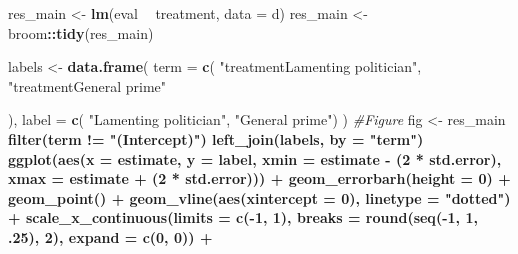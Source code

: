 \documentclass[]{book}
\newenvironment{Shaded}{\begin{snugshade}}{\end{snugshade}}
\newcommand{\KeywordTok}[1]{\textcolor[rgb]{0.13,0.29,0.53}{\textbf{#1}}}
\newcommand{\DataTypeTok}[1]{\textcolor[rgb]{0.13,0.29,0.53}{#1}}
\newcommand{\DecValTok}[1]{\textcolor[rgb]{0.00,0.00,0.81}{#1}}
\newcommand{\StringTok}[1]{\textcolor[rgb]{0.31,0.60,0.02}{#1}}
\newcommand{\CommentTok}[1]{\textcolor[rgb]{0.56,0.35,0.01}{\textit{#1}}}
\newcommand{\OperatorTok}[1]{\textcolor[rgb]{0.81,0.36,0.00}{\textbf{#1}}}
\newcommand{\NormalTok}[1]{#1}
\begin{document}
\begin{Shaded}
\begin{Highlighting}[]
\NormalTok{res_main <-}\StringTok{  }\KeywordTok{lm}\NormalTok{(eval }\OperatorTok{~}\StringTok{ }\NormalTok{treatment, }\DataTypeTok{data =}\NormalTok{ d) }
\NormalTok{res_main <-}\StringTok{ }\NormalTok{broom}\OperatorTok{::}\KeywordTok{tidy}\NormalTok{(res_main)}

\NormalTok{labels <-}\StringTok{ }\KeywordTok{data.frame}\NormalTok{(}
  \DataTypeTok{term =} \KeywordTok{c}\NormalTok{(}
    \StringTok{"treatmentLamenting politician"}\NormalTok{,}
    \StringTok{"treatmentGeneral prime"}
    
\NormalTok{  ),}
  \DataTypeTok{label =} \KeywordTok{c}\NormalTok{( }\StringTok{"Lamenting politician"}\NormalTok{,}
             \StringTok{"General prime"}\NormalTok{)}
\NormalTok{)}
\CommentTok{#Figure}
\NormalTok{fig <-}\StringTok{   }\NormalTok{res_main }\OperatorTok{%>%}
\StringTok{  }\KeywordTok{filter}\NormalTok{(term }\OperatorTok{!=}\StringTok{ "(Intercept)"}\NormalTok{) }\OperatorTok{%>%}\StringTok{ }
\StringTok{  }\KeywordTok{left_join}\NormalTok{(labels, }\DataTypeTok{by =} \StringTok{"term"}\NormalTok{) }\OperatorTok{%>%}\StringTok{ }
\StringTok{  }
\StringTok{  }\KeywordTok{ggplot}\NormalTok{(}\KeywordTok{aes}\NormalTok{(}\DataTypeTok{x =}\NormalTok{ estimate, }\DataTypeTok{y =}\NormalTok{ label,}
             \DataTypeTok{xmin =}\NormalTok{ estimate }\OperatorTok{-}\StringTok{ }\NormalTok{(}\DecValTok{2} \OperatorTok{*}\StringTok{ }\NormalTok{std.error),}
             \DataTypeTok{xmax =}\NormalTok{ estimate }\OperatorTok{+}\StringTok{ }\NormalTok{(}\DecValTok{2} \OperatorTok{*}\StringTok{ }\NormalTok{std.error))) }\OperatorTok{+}
\StringTok{   }\KeywordTok{geom_errorbarh}\NormalTok{(}\DataTypeTok{height =} \DecValTok{0}\NormalTok{) }\OperatorTok{+}
\StringTok{  }\KeywordTok{geom_point}\NormalTok{() }\OperatorTok{+}
\StringTok{  }\KeywordTok{geom_vline}\NormalTok{(}\KeywordTok{aes}\NormalTok{(}\DataTypeTok{xintercept =} \DecValTok{0}\NormalTok{), }\DataTypeTok{linetype =} \StringTok{"dotted"}\NormalTok{) }\OperatorTok{+}
\StringTok{  }\KeywordTok{scale_x_continuous}\NormalTok{(}\DataTypeTok{limits =} \KeywordTok{c}\NormalTok{(}\OperatorTok{-}\DecValTok{1}\NormalTok{, }\DecValTok{1}\NormalTok{),}
                     \DataTypeTok{breaks =} \KeywordTok{round}\NormalTok{(}\KeywordTok{seq}\NormalTok{(}\OperatorTok{-}\DecValTok{1}\NormalTok{, }\DecValTok{1}\NormalTok{, .}\DecValTok{25}\NormalTok{), }\DecValTok{2}\NormalTok{),}
                     \DataTypeTok{expand =} \KeywordTok{c}\NormalTok{(}\DecValTok{0}\NormalTok{, }\DecValTok{0}\NormalTok{)) }\OperatorTok{+}
}}}
\end{Highlighting}
\end{Shaded}
\end{document}
